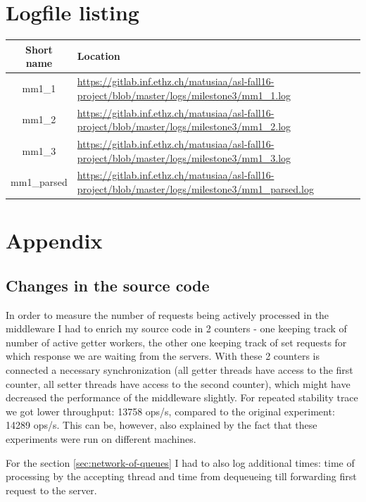 \documentclass[11pt]{article}
\begin{document}
\pagebreak

\section*{Logfile listing}

\begin{tabular}{|c|p{12.0cm}|}
\hline \textbf{Short name }& \textbf{Location} \\ 
\hline  mm1\_1 & \url{https://gitlab.inf.ethz.ch/matusiaa/asl-fall16-project/blob/master/logs/milestone3/mm1_1.log}\\ 
\hline mm1\_2 & \url{https://gitlab.inf.ethz.ch/matusiaa/asl-fall16-project/blob/master/logs/milestone3/mm1_2.log}\\ 
\hline mm1\_3 & \url{https://gitlab.inf.ethz.ch/matusiaa/asl-fall16-project/blob/master/logs/milestone3/mm1_3.log}\\ 
\hline mm1\_parsed & \url{https://gitlab.inf.ethz.ch/matusiaa/asl-fall16-project/blob/master/logs/milestone3/mm1_parsed.log}\\ 
\hline 
\end{tabular}

\pagebreak

\section*{Appendix}

\subsection{Changes in the source code}
In order to measure the number of requests being actively processed in the middleware I had to enrich my source code in 2 counters - one keeping track of number of active getter workers, the other one keeping track of set requests for which response we are waiting from the servers. With these 2 counters is connected a necessary synchronization (all getter threads have access to the first counter, all setter threads have access to the second counter), which might have decreased the performance of the middleware slightly. For repeated stability trace we got lower throughput: 13758 ops/s, compared to the original experiment: 14289 ops/s. This can be, however, also explained by the fact that these experiments were run on different machines.

For the section \ref{sec:network-of-queues} I had to also log additional times: time of processing by the accepting thread and time from dequeueing till forwarding first request to the server. 
\end{document}
